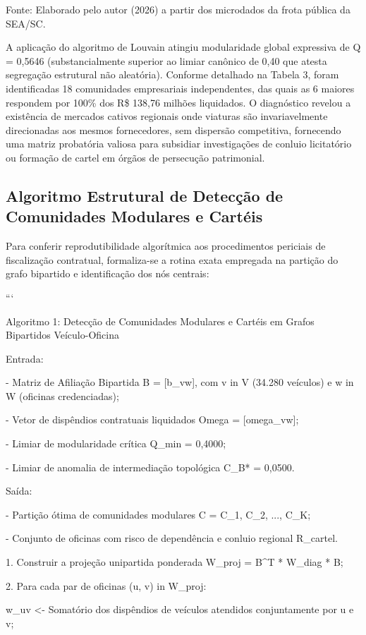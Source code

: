 \documentclass[12pt,a4paper]{article}
\begin{document}
Fonte: Elaborado pelo autor (2026) a partir dos microdados da frota pública da SEA/SC.

A aplicação do algoritmo de Louvain atingiu modularidade global expressiva de Q = 0,5646 (substancialmente superior ao limiar canônico de 0,40 que atesta segregação estrutural não aleatória). Conforme detalhado na Tabela 3, foram identificadas 18 comunidades empresariais independentes, das quais as 6 maiores respondem por 100\% dos R\$ 138,76 milhões liquidados. O diagnóstico revelou a existência de mercados cativos regionais onde viaturas são invariavelmente direcionadas aos mesmos fornecedores, sem dispersão competitiva, fornecendo uma matriz probatória valiosa para subsidiar investigações de conluio licitatório ou formação de cartel em órgãos de persecução patrimonial.


\subsection{Algoritmo Estrutural de Detecção de Comunidades Modulares e Cartéis}

Para conferir reprodutibilidade algorítmica aos procedimentos periciais de fiscalização contratual, formaliza-se a rotina exata empregada na partição do grafo bipartido e identificação dos nós centrais:

```

Algoritmo 1: Detecção de Comunidades Modulares e Cartéis em Grafos Bipartidos Veículo-Oficina

Entrada:

- Matriz de Afiliação Bipartida B = [b\_vw], com v in V (34.280 veículos) e w in W (oficinas credenciadas);

- Vetor de dispêndios contratuais liquidados Omega = [omega\_vw];

- Limiar de modularidade crítica Q\_min = 0,4000;

- Limiar de anomalia de intermediação topológica C\_B* = 0,0500.

Saída:

- Partição ótima de comunidades modulares C = {C\_1, C\_2, ..., C\_K};

- Conjunto de oficinas com risco de dependência e conluio regional R\_cartel.

1. Construir a projeção unipartida ponderada W\_proj = B^T * W\_diag * B;

2. Para cada par de oficinas (u, v) in W\_proj:

w\_uv <- Somatório dos dispêndios de veículos atendidos conjuntamente por u e v;
\end{document}
